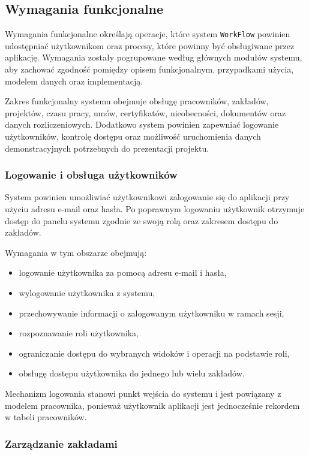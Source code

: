 \subsection{Wymagania funkcjonalne}

Wymagania funkcjonalne określają operacje, które system \texttt{WorkFlow} powinien udostępniać użytkownikom oraz procesy, które powinny być obsługiwane przez aplikację. Wymagania zostały pogrupowane według głównych modułów systemu, aby zachować zgodność pomiędzy opisem funkcjonalnym, przypadkami użycia, modelem danych oraz implementacją.

Zakres funkcjonalny systemu obejmuje obsługę pracowników, zakładów, projektów, czasu pracy, umów, certyfikatów, nieobecności, dokumentów oraz danych rozliczeniowych. Dodatkowo system powinien zapewniać logowanie użytkowników, kontrolę dostępu oraz możliwość uruchomienia danych demonstracyjnych potrzebnych do prezentacji projektu.

\subsubsection{Logowanie i obsługa użytkowników}

System powinien umożliwiać użytkownikowi zalogowanie się do aplikacji przy użyciu adresu e-mail oraz hasła. Po poprawnym logowaniu użytkownik otrzymuje dostęp do panelu systemu zgodnie ze swoją rolą oraz zakresem dostępu do zakładów.

Wymagania w tym obszarze obejmują:
\begin{itemize}
    \item logowanie użytkownika za pomocą adresu e-mail i hasła,
    \item wylogowanie użytkownika z systemu,
    \item przechowywanie informacji o zalogowanym użytkowniku w ramach sesji,
    \item rozpoznawanie roli użytkownika,
    \item ograniczanie dostępu do wybranych widoków i operacji na podstawie roli,
    \item obsługę dostępu użytkownika do jednego lub wielu zakładów.
\end{itemize}

Mechanizm logowania stanowi punkt wejścia do systemu i jest powiązany z modelem pracownika, ponieważ użytkownik aplikacji jest jednocześnie rekordem w tabeli pracowników.

\subsubsection{Zarządzanie zakładami}

